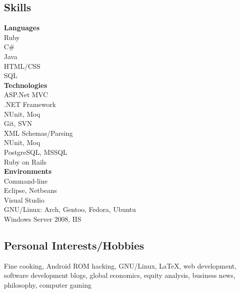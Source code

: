 \documentclass[10pt]{article}
\begin{document}
\subsection*{Skills}
\begin{multicols*}{3}

\noindent \textbf{Languages} \vspace*{5pt}\\
Ruby\\
C\#\\
Java\\
HTML/CSS\\
\columnbreak
SQL\\
\noindent \textbf{Technologies} \vspace*{5pt} \\
ASP.Net MVC \\
.NET Framework \\
NUnit, Moq \\
Git, SVN \\
XML Schemas/Parsing\\
NUnit, Moq\\
PostgreSQL, MSSQL\\
\columnbreak
Ruby on Rails\\
\noindent \textbf{Environments} \vspace{5pt} \\
Command-line\\
Eclipse, Netbeans\\
Visual Studio\\
GNU/Linux: Arch, Gentoo, Fedora, \indent Ubuntu\\
Windows Server 2008, IIS\\
\end{multicols*}

{
\subsection*{Personal Interests/Hobbies}
\noindent
Fine cooking, Android ROM hacking, GNU/Linux, \LaTeX, web development, software development blogs, global economics, equity analysis, business news, philosophy, computer gaming
}{}
\end{document}
